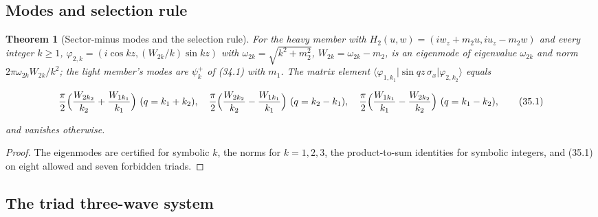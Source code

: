 \documentclass[11pt]{article}
\newtheorem{theorem}{Theorem}[section]
\theoremstyle{remark}
\begin{document}
\subsection{Modes and selection rule}

\begin{theorem}[Sector-minus modes and the selection rule]
\label{thm:v20v32-modes}
For the heavy member with \(H_2(u,w)=(iw_z+m_2u,iu_z-m_2w)\) and every
integer \(k\ge1\), \(\varphi_{2,k}=(i\cos kz,(W_{2k}/k)\sin kz)\) with
\(\omega_{2k}=\sqrt{k^2+m_2^2}\), \(W_{2k}=\omega_{2k}-m_2\), is an eigenmode
of eigenvalue \(\omega_{2k}\) and norm \(2\pi\omega_{2k}W_{2k}/k^2\); the
light member's modes are \(\psi_k^+\) of (34.1) with \(m_1\).  The
matrix element \(\langle\varphi_{1,k_1}|\sin qz\,\sigma_x|\varphi_{2,k_2}\rangle\)
equals

\[
 \frac\pi2\Bigl(\frac{W_{2k_2}}{k_2}+\frac{W_{1k_1}}{k_1}\Bigr)\ (q=k_1+k_2),\quad
 \frac\pi2\Bigl(\frac{W_{2k_2}}{k_2}-\frac{W_{1k_1}}{k_1}\Bigr)\ (q=k_2-k_1),\quad
 \frac\pi2\Bigl(\frac{W_{1k_1}}{k_1}-\frac{W_{2k_2}}{k_2}\Bigr)\ (q=k_1-k_2),
                                                                    \tag{35.1}
\]

and vanishes otherwise.
\end{theorem}

\begin{proof}
The eigenmodes are certified for symbolic \(k\), the norms for
\(k=1,2,3\), the product-to-sum identities for symbolic integers,
and (35.1) on eight allowed and seven forbidden triads.
\end{proof}

\subsection{The triad three-wave system}
\end{document}
